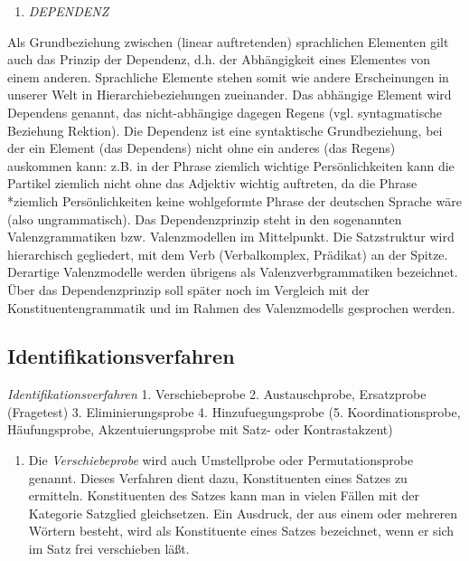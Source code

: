 \documentclass[
]{article}
\providecommand{\tightlist}{%
  \setlength{\itemsep}{0pt}\setlength{\parskip}{0pt}}
\begin{document}
\begin{enumerate}
\def\labelenumi{\arabic{enumi}.}
\setcounter{enumi}{3}
\tightlist
\item
  \emph{DEPENDENZ}
\end{enumerate}

Als Grundbeziehung zwischen (linear auftretenden) sprachlichen Elementen gilt auch das Prinzip der Dependenz, d.h. der Abhängigkeit eines Elementes von einem anderen. Sprachliche Elemente stehen somit wie andere Erscheinungen in unserer Welt in Hierarchiebeziehungen zueinander. Das abhängige Element wird Dependens genannt, das nicht-abhängige dagegen Regens (vgl. syntagmatische Beziehung Rektion). Die Dependenz ist eine syntaktische Grundbeziehung, bei der ein Element (das Dependens) nicht ohne ein anderes (das Regens) auskommen kann: z.B. in der Phrase ziemlich wichtige Persönlichkeiten kann die Partikel ziemlich nicht ohne das Adjektiv wichtig auftreten, da die Phrase *ziemlich Persönlichkeiten keine wohlgeformte Phrase der deutschen Sprache wäre (also ungrammatisch). Das Dependenzprinzip steht in den sogenannten Valenzgrammatiken bzw. Valenzmodellen im Mittelpunkt. Die Satzstruktur wird hierarchisch gegliedert, mit dem Verb (Verbalkomplex, Prädikat) an der Spitze. Derartige Valenzmodelle werden übrigens als Valenzverbgrammatiken bezeichnet. Über das Dependenzprinzip soll später noch im Vergleich mit der Konstituentengrammatik und im Rahmen des Valenzmodells gesprochen werden.

\hypertarget{identifikationsverfahren}{%
\subsection{Identifikationsverfahren}\label{identifikationsverfahren}}

\emph{Identifikationsverfahren}
1. Verschiebeprobe
2. Austauschprobe, Ersatzprobe (Fragetest)
3. Eliminierungsprobe
4. Hinzufuegungsprobe
(5. Koordinationsprobe, Häufungsprobe, Akzentuierungsprobe mit Satz- oder Kontrastakzent)

\begin{enumerate}
\def\labelenumi{\arabic{enumi}.}
\tightlist
\item
  Die \emph{Verschiebeprobe} wird auch Umstellprobe oder Permutationsprobe genannt. Dieses Verfahren dient dazu, Konstituenten eines Satzes zu ermitteln. Konstituenten des Satzes kann man in vielen Fällen mit der Kategorie Satzglied gleichsetzen. Ein Ausdruck, der aus einem oder mehreren Wörtern besteht, wird als Konstituente eines Satzes bezeichnet, wenn er sich im Satz frei verschieben läßt.
\end{enumerate}
\end{document}
